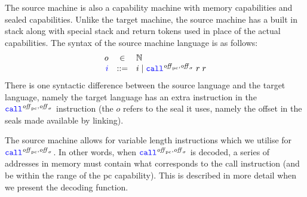 \documentclass[a4paper]{article}
\begin{document}

The source machine is also a capability machine with memory capabilities and sealed capabilities. Unlike the target machine, the source machine has a built in stack along with special stack and return tokens used in place of the actual capabilities. The syntax of the source machine language is as follows:
\[
  \begin{array}{rcl}
    o & \in & \nats \\
    \src{i} & \defbnf &  \com{i} \mid \scall{\offpc,\offsigma}{r}{r}
  \end{array}
\]
There is one syntactic difference between the source language and the target language, namely the target language has an extra instruction in the $\scall{\offpc,\offsigma}{}{}$ instruction (the $o$ refers to the seal it uses, namely the offset in the seals made available by linking). 

The source machine allows for variable length instructions which we utilise for $\scall{\offpc,\offsigma}{}{}$. In other words, when $\scall{\offpc,\offsigma}{}{}$ is decoded, a series of addresses in memory must contain what corresponds to the call instruction (and be within the range of the pc capability). This is described in more detail when we present the decoding function.
\end{document}
